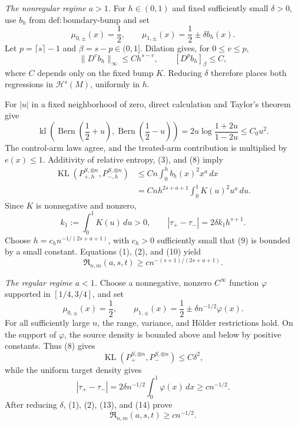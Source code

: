 \emph{The nonregular regime \(a>1\).}
For \(h\in(0,1)\) and fixed sufficiently small \(\delta>0\), use \(b_h\) from \(\mathrm{def:boundary\text{-}bump}\) and set
\[
 \mu_{0,\pm}(x)=\frac12,
 \qquad
 \mu_{1,\pm}(x)=\frac12\pm\delta b_h(x).
\tag{6}
\]
Let \(p=\lceil s\rceil-1\) and \(\beta=s-p\in(0,1]\).  Dilation gives, for \(0\le v\le p\),
\[
 \lVert D^v b_h\rVert_\infty\le C h^{s-v},
 \qquad [D^p b_h]_{\beta}\le C,
\tag{7}
\]
where \(C\) depends only on the fixed bump \(K\).  Reducing \(\delta\) therefore places both regressions in \(\mathcal H^s(M)\), uniformly in \(h\).

For \(|u|\) in a fixed neighborhood of zero, direct calculation and Taylor's theorem give
\[
 \operatorname{kl}\!\left(
  \operatorname{Bern}\!\left(\frac12+u\right),
  \operatorname{Bern}\!\left(\frac12-u\right)
 \right)
 =2u\log\frac{1+2u}{1-2u}
 \le C_0u^2.
\tag{8}
\]
The control-arm laws agree, and the treated-arm contribution is multiplied by \(e(x)\le1\).  Additivity of relative entropy, (3), and (8) imply
\[
 \begin{aligned}
 \operatorname{KL}(P_{+,h}^{S,\otimes n},P_{-,h}^{S,\otimes n})
 &\le Cn\int_0^h b_h(x)^2x^a\,dx\\
 &=Cnh^{2s+a+1}\int_0^1K(u)^2u^a\,du.
 \end{aligned}
\tag{9}
\]
Since \(K\) is nonnegative and nonzero,
\[
 k_1:=\int_0^1K(u)\,du>0,
 \qquad
 |\tau_+-\tau_-|=2\delta k_1h^{s+1}.
\tag{10}
\]
Choose \(h=c_hn^{-1/(2s+a+1)}\), with \(c_h>0\) sufficiently small that (9) is bounded by a small constant.  Equations (1), (2), and (10) yield
\[
 \mathfrak R_{n,m}(a,s,t)
 \ge c n^{-(s+1)/(2s+a+1)}.
\tag{11}
\]

\emph{The regular regime \(a<1\).}
Choose a nonnegative, nonzero \(C^\infty\) function \(\varphi\) supported in \([1/4,3/4]\), and set
\[
 \mu_{0,\pm}(x)=\frac12,
 \qquad
 \mu_{1,\pm}(x)=\frac12\pm\delta n^{-1/2}\varphi(x).
\tag{12}
\]
For all sufficiently large \(n\), the range, variance, and H\"older restrictions hold.  On the support of \(\varphi\), the source density is bounded above and below by positive constants.  Thus (8) gives
\[
 \operatorname{KL}(P_+^{S,\otimes n},P_-^{S,\otimes n})
 \le C\delta^2,
\tag{13}
\]
while the uniform target density gives
\[
 |\tau_+-\tau_-|
 =2\delta n^{-1/2}\int_0^1\varphi(x)\,dx
 \ge c n^{-1/2}.
\tag{14}
\]
After reducing \(\delta\), (1), (2), (13), and (14) prove
\[
 \mathfrak R_{n,m}(a,s,t)\ge c n^{-1/2}.
\tag{15}
\]

